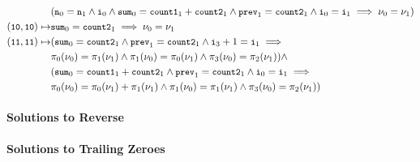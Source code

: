 \begin{align*}
  & (\cc{n}_0 = \cc{n}_1 \land \cc{i}_0 \land %
  \cc{sum}_0 = \cc{count1}_1 + \cc{count2}_1 \land %
  \cc{prev}_1 = \cc{count2}_1 \land %
  \cc{i}_0 = \cc{i}_1 \implies %
  \nu_0 = \nu_1) \\
  (\cc{10}, \cc{10}) \mapsto & \cc{sum}_0 = \cc{count2}_1 \implies %
  \nu_0 = \nu_1 \\
  (\cc{11}, \cc{11}) \mapsto & 
  (\cc{sum}_0 = \cc{count2}_1 \land %
  \cc{prev}_1 = \cc{count2}_1 \land %
  \cc{i}_3 + 1 = \cc{i}_1 \implies \\
  & \pi_0(\nu_0) = \pi_1(\nu_1) \land %
  \pi_1(\nu_0) = \pi_0(\nu_1) \land %
  \pi_3(\nu_0) = \pi_2(\nu_1)) \land \\
  & (\cc{sum}_0 = \cc{count1}_1 + \cc{count2}_1 \land %
  \cc{prev}_1 = \cc{count2}_1 \land %
  \cc{i}_0 = \cc{i}_1 \implies \\ %
  & \pi_0(\nu_0) = \pi_0(\nu_1) + \pi_1(\nu_1) \land %
  \pi_1(\nu_0) = \pi_1(\nu_1) \land %
  \pi_3(\nu_0) = \pi_2(\nu_1)) \\
\end{align*}
%
%


\paragraph{Solutions to Reverse}
%

\paragraph{Solutions to Trailing Zeroes}

